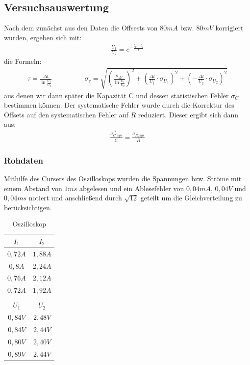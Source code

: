 \documentclass[12pt,a4paper]{article}
\begin{document}
\subsection{Versuchsauswertung}
Nach dem zunächst aus den Daten die Offsests von $80mA$ bzw. $80mV$ korrigiert wurden, ergeben sich mit:
\begin{align*}
\frac{U_1}{U_2}=e^{-\frac{t_1-t_2}{\tau}}
\end{align*}
die Formeln:
\begin{align*}
\tau=\frac{\Delta t}{\ln{\frac{U_1}{U_2}}} \hspace{2cm}
\sigma_{\tau}=\sqrt{(\frac{\sigma_{\Delta t}}{\ln{\frac{U_1}{U_2}}})^2+(\frac{\Delta t}{U_1} \cdot \sigma_{U_1})^2+(-\frac{\Delta t}{U_2} \cdot \sigma_{U_2})^2}
\end{align*}
aus denen wir dann später die Kapazität C und dessen statistischen Fehler $\sigma_C$ bestimmen können.
Der systematische Fehler wurde durch die Korrektur des Offsets auf den systematischen Fehler auf $R$ reduziert. Dieser ergibt sich dann aus:
\begin{align*}
\frac{\sigma_{C,sys}^R}{C}=\frac{\sigma_{R,sys}}{R}
\end{align*}
\subsubsection{Rohdaten}
Mithilfe des Cursers des Oszilloskops wurden die Spannungen bzw. Ströme mit einem Abstand von $1ms$ abgelesen und ein Ablesefehler von $0,04mA$,      \hspace{1mm} $0,04V$ und $0,04ms$ notiert und anschließend durch $\sqrt{12}$ geteilt um die Gleichverteilung zu berücksichtigen.
\begin{table}[H]\centering
\caption{Oszilloskop}
\begin{tabular}{c|c}
$I_1$& $I_2$\\ \hline
$0,72A$& $1,88A$\\ 
$0,8A$& $2,24A$ \\
$0,76A$& $2,12A$ \\
$0,72A$& $1,92A$ \\
\\
$U_1$& $U_2$ \\ \hline
$0,84V$& $2,48V$ \\
$0,84V$& $2,44V$ \\
$0,80V$& $2,40V$ \\
$0,89V$& $2,44V$ \\
\end{tabular} 
\end{table}
\end{document}
